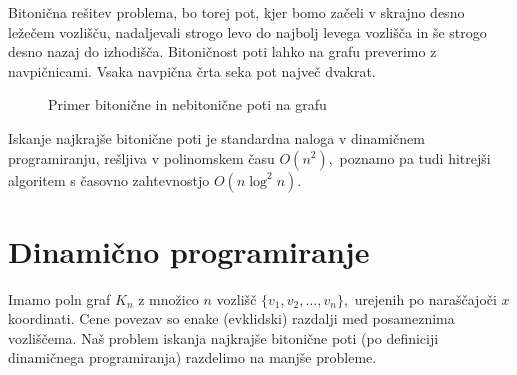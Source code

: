 \documentclass[12pt,a4paper]{amsart}
\theoremstyle{definition}
\theoremstyle{plain}
\begin{document}
\noindent
Bitonična rešitev problema, bo torej pot, kjer bomo začeli v skrajno desno ležečem vozlišču, nadaljevali strogo
levo do najbolj levega vozlišča in še strogo desno nazaj do izhodišča. Bitoničnost poti lahko na grafu 
preverimo z navpičnicami. Vsaka navpična črta seka pot največ dvakrat.


\begin{figure}[!htb]%
    \centering
    \qquad
    \caption{Primer bitonične in nebitonične poti na grafu}%
    \label{fig:example}%
\end{figure}


\noindent
Iskanje najkrajše bitonične poti je standardna naloga v dinamičnem programiranju, rešljiva v polinomskem
času $O(n^2),$ poznamo pa tudi hitrejši algoritem s časovno zahtevnostjo $O(n \log^2 n).$

\section{Dinamično programiranje}

\noindent
Imamo poln graf $K_n$ z množico $n$ vozlišč $\{v_1, v_2, \ldots, v_n\},$ urejenih po naraščajoči $x$ koordinati. 
Cene povezav so enake (evklidski) razdalji med posameznima vozliščema. Naš problem iskanja najkrajše 
bitonične poti (po definiciji dinamičnega programiranja) razdelimo na manjše probleme.
\newline
\end{document}
